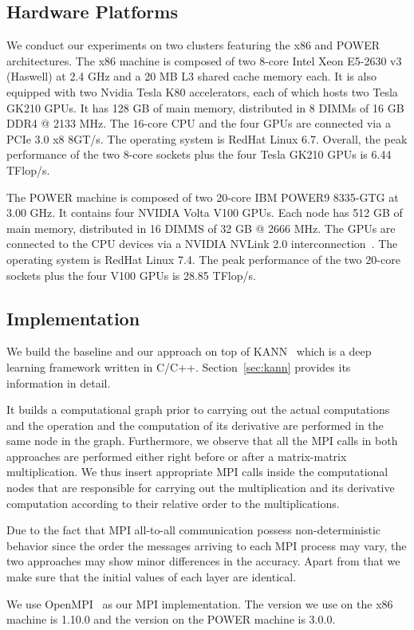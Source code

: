 \subsection{Hardware Platforms}
\label{sec:altsplit_platform}
We conduct our experiments on two clusters featuring the x86 and POWER 
architectures.
The x86 machine is composed of two 8-core Intel Xeon
\textregistered E5-2630 v3 (Haswell) at 2.4 GHz and a 20 MB L3 shared cache 
memory each.  It is also equipped with two Nvidia Tesla K80 accelerators, each 
of which hosts two Tesla GK210 GPUs.
It has 128 GB of main memory, distributed in 8 DIMMs of 16 GB DDR4 @ 2133 MHz.
The 16-core CPU and the four GPUs are connected via a PCIe 3.0 x8 8GT/s.
The operating system is RedHat Linux 6.7.
Overall, the peak performance of the two 8-core sockets plus the four Tesla 
GK210 GPUs is 6.44 TFlop/s. 

The POWER machine is composed of two 20-core IBM POWER9 8335-GTG at 3.00 GHz.  
It contains four NVIDIA Volta V100 GPUs.  
Each node has 512 GB of main memory, distributed in 16 DIMMS of 32 GB @ 2666 
MHz.  The GPUs are connected to the CPU devices via a NVIDIA NVLink 2.0 
interconnection~\cite{nvlink}.  The operating system is RedHat Linux 7.4.  The 
peak performance of the two 20-core sockets plus the four V100 GPUs is 28.85 
TFlop/s. 

\subsection{Implementation}
\label{sec:altsplit_software}
We build the baseline and our approach on top of KANN~\cite{kann} which is a 
deep learning framework written in C/C++. Section~\ref{sec:kann} provides its 
information in detail. 

It builds a computational graph prior to carrying out the actual computations 
and the operation and the computation of its derivative are performed in the same 
node in the graph. Furthermore, we observe that all the MPI calls in both 
approaches are performed either right before or after a matrix-matrix 
multiplication. We thus insert appropriate MPI calls inside the computational 
nodes that are responsible for carrying out the multiplication and its 
derivative computation according to their relative order to the multiplications.

Due to the fact that MPI all-to-all communication possess non-deterministic 
behavior since the order the messages arriving to each MPI process may vary, the 
two approaches may show minor differences in the accuracy. Apart from that we 
make sure that the initial values of each layer are identical. 

We use OpenMPI~\cite{openmpi, openmpi1} as our MPI implementation. The version we use 
on the x86 machine is 1.10.0 and the version on the POWER machine is 3.0.0.